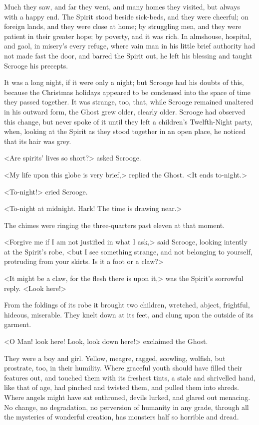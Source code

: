 Much they saw, and far they went, and many homes they visited, but always with a
happy end. The Spirit stood beside sick-beds, and they were cheerful; on foreign
lands, and they were close at home; by struggling men, and they were patient in
their greater hope; by poverty, and it was rich. In almshouse, hospital, and
gaol, in misery's every refuge, where vain man in his little brief authority had
not made fast the door, and barred the Spirit out, he left his blessing and
taught Scrooge his precepts.

It was a long night, if it were only a night; but Scrooge had his doubts of
this, because the Christmas holidays appeared to be condensed into the space of
time they passed together. It was strange, too, that, while Scrooge remained
unaltered in his outward form, the Ghost grew older, clearly older. Scrooge had
observed this change, but never spoke of it until they left a children's
Twelfth-Night party, when, looking at the Spirit as they stood together in an
open place, he noticed that its hair was grey.

<Are spirits' lives so short?> asked Scrooge.

<My life upon this globe is very brief,> replied the Ghost. <It ends to-night.>

<To-night!> cried Scrooge.

<To-night at midnight. Hark! The time is drawing near.>

The chimes were ringing the three-quarters past eleven at that moment.

<Forgive me if I am not justified in what I ask,> said Scrooge, looking intently
at the Spirit's robe, <but I see something strange, and not belonging to
yourself, protruding from your skirts. Is it a foot or a claw?>

<It might be a claw, for the flesh there is upon it,> was the Spirit's sorrowful
reply. <Look here!>

From the foldings of its robe it brought two children, wretched, abject,
frightful, hideous, miserable. They knelt down at its feet, and clung upon the
outside of its garment.

<O Man! look here! Look, look down here!> exclaimed the Ghost.

They were a boy and girl. Yellow, meagre, ragged, scowling, wolfish, but
prostrate, too, in their humility. Where graceful youth should have filled their
features out, and touched them with its freshest tints, a stale and shrivelled
hand, like that of age, had pinched and twisted them, and pulled them into
shreds. Where angels might have sat enthroned, devils lurked, and glared out
menacing. No change, no degradation, no perversion of humanity in any grade,
through all the mysteries of wonderful creation, has monsters half so horrible
and dread.

